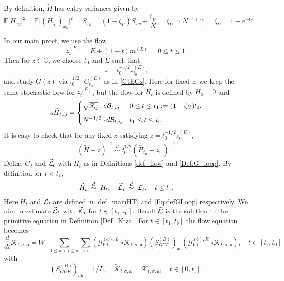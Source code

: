 \documentclass[10pt,reqno]{article}
\theoremstyle{plain} %
\theoremstyle{remark}
\numberwithin{equation}{section}
\begin{document}
 By definition, \( \widetilde{ H} \) has entry variances given by  
\[
\mathbb{E} \big| \widetilde{H}_{xy} \big|^2 =\mathbb{E} \big|  \left(H_{t_U}\right)_{xy} \big|^2= \widetilde{S}_{xy}  = (1-\zeta_U) S_{xy} + \frac{\zeta_U}{N}, \quad \zeta_U \sim  N^{-1+\tau_U}, \quad \zeta_U=1-e^{-t_U}
\]


  

In our main proof, we use the flow 
 $$
  z^{(E)}_t=E+(1-t) m^{(E)}  ,\quad 0\le t\le 1.   
$$ 
Then for \( z \in \mathbb{C} \), we choose \( t_0 \) and \( E \) such that  
\[
z = t_0^{-1/2} z_{t_0}^{(E)},
\]
and study \( G(z) \) via \( t_0^{1/2} \cdot G^{(E)}_{t_0} \) as in \eqref{GtEGz}. Here for fixed $z$,  we keep the same stochastic flow for \( z^{(E)}_t \), but the  flow for \( \widetilde{H}_t \) is defined by \( \widetilde{H}_0 = 0 \) and  
\[
d\widetilde{H}_{t,ij} =
\begin{cases}
    \sqrt{S_{ij}} \cdot d{\cal B}_{t,ij} & 0\le t \le t_1 := (1-\zeta_U)t_0, \\[6pt]
      N^{-1/2} \cdot d{\cal B}_{t,ij} &   t_1 \le   t\le t_0.
\end{cases} 
\]
It is easy to check that for any fixed $z$ satisfying $z = t_0^{-1/2} z_{t_0}^{(E)}$, 
\begin{align}\label{whheiyslwuw}
(\widetilde{H}-z)^{-1}\; \overset{d}{\sim}\;  t_0^{1/2}(\widetilde{H}_{t_0}-z_{t_0})^{-1} 
\end{align}
Define $\widetilde{G}_t$ and $\widetilde{{\cal L}}_t$ with $\widetilde{H}_t$ as in Definitions \ref{def_flow} and  \ref{Def:G_loop}. By definition for $t<t_1$, 
$$
 \widetilde{H}_t\; \overset{d}{\sim}\; H_t,\quad
\widetilde{{\cal L}}_t\;\overset{d}{\sim}\; {{\cal L}}_t, \quad t\le t_1.
 $$
 Here  $H_t$ and ${{\cal L}}_t$ are defined in \eqref{def_mainHT} and \eqref{Eq:defGLoop} respectively.  We aim to estimate $\widetilde{{\cal L}}_t$ with $\widetilde{{\cal K}}_t$ for $t\in [t_1,t_0]$. Recall  $\widetilde{{\cal K}}$ is the solution to the primitive equation in Definition \ref{Def_Ktza}. For  $t\in  [t_1,t_0]$ the flow equation    becomes 
$$\frac{d}{d t} \mathcal{\widetilde{K}}_{t, \sigma, \textbf{a}}=W \cdot \sum_{1 \leq k<l \leq n} \sum_{a, b}\left(\mathcal{G}_{k, l}^{(a), L} \circ \mathcal{\widetilde{K}}_{t, \sigma, \textbf{a}}\right) \left(S_{GUE}^{(B)}\right)_{a b}\left(\mathcal{G}_{k, l}^{(b), R} \circ \mathcal{\widetilde{K}}_{t, \sigma, \textbf{a}}\right),\quad t\in [t_1,t_0]
$$
with 
$$ \left(S^{(B)}_{GUE}\right)_{ab}=1/L, \quad \mathcal{\widetilde{K}}_{t, \sigma, \textbf{a}}=\mathcal{ {K}}_{t, \sigma, \textbf{a}},\quad t\in [0,t_1].
$$ 
\end{document}
